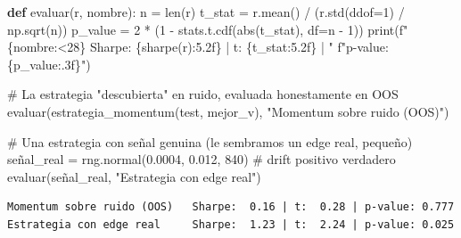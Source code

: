 \documentclass[
  spanish,
  letterpaper,
  DIV=11,
  numbers=noendperiod]{scrreprt}
\newenvironment{Shaded}{\begin{snugshade}}{\end{snugshade}}
\newcommand{\BuiltInTok}[1]{\textcolor[rgb]{0.00,0.23,0.31}{#1}}
\newcommand{\CommentTok}[1]{\textcolor[rgb]{0.37,0.37,0.37}{#1}}
\newcommand{\DecValTok}[1]{\textcolor[rgb]{0.68,0.00,0.00}{#1}}
\newcommand{\FloatTok}[1]{\textcolor[rgb]{0.68,0.00,0.00}{#1}}
\newcommand{\KeywordTok}[1]{\textcolor[rgb]{0.00,0.23,0.31}{\textbf{#1}}}
\newcommand{\NormalTok}[1]{\textcolor[rgb]{0.00,0.23,0.31}{#1}}
\newcommand{\OperatorTok}[1]{\textcolor[rgb]{0.37,0.37,0.37}{#1}}
\newcommand{\SpecialCharTok}[1]{\textcolor[rgb]{0.37,0.37,0.37}{#1}}
\newcommand{\SpecialStringTok}[1]{\textcolor[rgb]{0.13,0.47,0.30}{#1}}
\newcommand{\StringTok}[1]{\textcolor[rgb]{0.13,0.47,0.30}{#1}}
\begin{document}
\label{pvalue-estrategia}
\begin{Shaded}
\begin{Highlighting}[]
\KeywordTok{def}\NormalTok{ evaluar(r, nombre):}
\NormalTok{    n }\OperatorTok{=} \BuiltInTok{len}\NormalTok{(r)}
\NormalTok{    t\_stat }\OperatorTok{=}\NormalTok{ r.mean() }\OperatorTok{/}\NormalTok{ (r.std(ddof}\OperatorTok{=}\DecValTok{1}\NormalTok{) }\OperatorTok{/}\NormalTok{ np.sqrt(n))}
\NormalTok{    p\_value }\OperatorTok{=} \DecValTok{2} \OperatorTok{*}\NormalTok{ (}\DecValTok{1} \OperatorTok{{-}}\NormalTok{ stats.t.cdf(}\BuiltInTok{abs}\NormalTok{(t\_stat), df}\OperatorTok{=}\NormalTok{n }\OperatorTok{{-}} \DecValTok{1}\NormalTok{))}
    \BuiltInTok{print}\NormalTok{(}\SpecialStringTok{f"}\SpecialCharTok{\{}\NormalTok{nombre}\SpecialCharTok{:\textless{}28\}}\SpecialStringTok{ Sharpe: }\SpecialCharTok{\{}\NormalTok{sharpe(r)}\SpecialCharTok{:5.2f\}}\SpecialStringTok{ | t: }\SpecialCharTok{\{}\NormalTok{t\_stat}\SpecialCharTok{:5.2f\}}\SpecialStringTok{ | "}
          \SpecialStringTok{f"p{-}value: }\SpecialCharTok{\{}\NormalTok{p\_value}\SpecialCharTok{:.3f\}}\SpecialStringTok{"}\NormalTok{)}

\CommentTok{\# La estrategia "descubierta" en ruido, evaluada honestamente en OOS}
\NormalTok{evaluar(estrategia\_momentum(test, mejor\_v), }\StringTok{"Momentum sobre ruido (OOS)"}\NormalTok{)}

\CommentTok{\# Una estrategia con señal genuina (le sembramos un edge real, pequeño)}
\NormalTok{señal\_real }\OperatorTok{=}\NormalTok{ rng.normal(}\FloatTok{0.0004}\NormalTok{, }\FloatTok{0.012}\NormalTok{, }\DecValTok{840}\NormalTok{)   }\CommentTok{\# drift positivo verdadero}
\NormalTok{evaluar(señal\_real, }\StringTok{"Estrategia con edge real"}\NormalTok{)}
\end{Highlighting}
\end{Shaded}

\begin{verbatim}
Momentum sobre ruido (OOS)   Sharpe:  0.16 | t:  0.28 | p-value: 0.777
Estrategia con edge real     Sharpe:  1.23 | t:  2.24 | p-value: 0.025
\end{verbatim}
\end{document}
